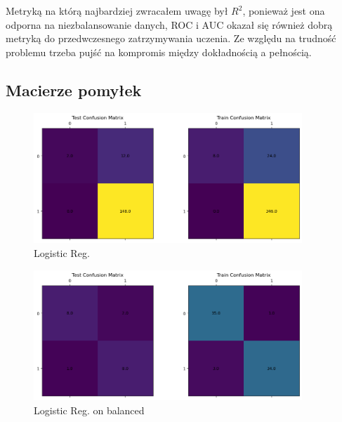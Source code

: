 \documentclass[12pt]{article}
\begin{document}
        
        Metryką na którą najbardziej zwracałem uwagę był $R^2$, ponieważ jest ona odporna na niezbalansowanie danych, 
        ROC i AUC okazał się również dobrą metryką do przedwczesnego zatrzymywania uczenia. Ze względu na trudność problemu
        trzeba pujść na kompromis między dokładnością a pełnością.
        
        \newpage

        \newpage

        \subsection{Macierze pomyłek}

        \begin{figure}[ht!]
            \centering
            \includegraphics[width=0.9\textwidth]{resources/conf_logistic_regr.png}
            \caption{Logistic Reg.}
            \label{fig:conf_logistic_regr}
        \end{figure}


        \begin{figure}[h!]
            \centering
            \includegraphics[width=0.9\textwidth]{resources/conf_logistic_regr_on_balanced.png}
            \caption{Logistic Reg. on balanced}
            \label{fig:conf_logistic_regr_on_balanced}
        \end{figure}
\end{document}
